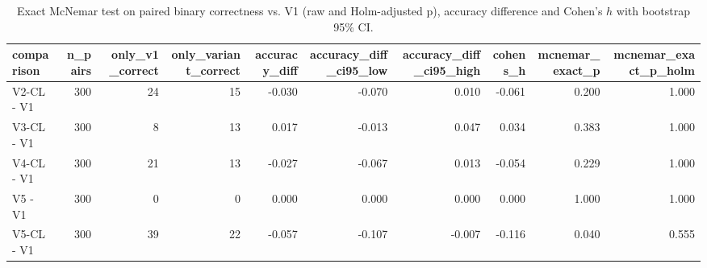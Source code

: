 \begin{table}[t]
\centering
\small
\begin{tabular}{lrrrrrrrrr}
\toprule
comparison & n\_pairs & only\_v1\_correct & only\_variant\_correct & accuracy\_diff & accuracy\_diff\_ci95\_low & accuracy\_diff\_ci95\_high & cohens\_h & mcnemar\_exact\_p & mcnemar\_exact\_p\_holm \\
\midrule
V2-CL - V1 & 300 & 24 & 15 & -0.030 & -0.070 & 0.010 & -0.061 & 0.200 & 1.000 \\
V3-CL - V1 & 300 & 8 & 13 & 0.017 & -0.013 & 0.047 & 0.034 & 0.383 & 1.000 \\
V4-CL - V1 & 300 & 21 & 13 & -0.027 & -0.067 & 0.013 & -0.054 & 0.229 & 1.000 \\
V5 - V1 & 300 & 0 & 0 & 0.000 & 0.000 & 0.000 & 0.000 & 1.000 & 1.000 \\
V5-CL - V1 & 300 & 39 & 22 & -0.057 & -0.107 & -0.007 & -0.116 & 0.040 & 0.555 \\
\bottomrule
\end{tabular}
\caption{Exact McNemar test on paired binary correctness vs. V1 (raw and Holm-adjusted p), accuracy difference and Cohen's $h$ with bootstrap 95\% CI.}
\label{tab:rigor_accuracy_tests}
\end{table}
